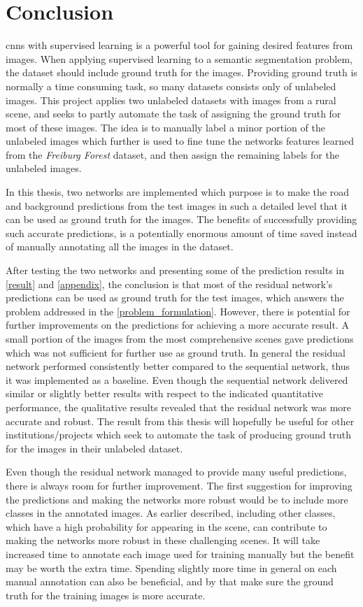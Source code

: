 \documentclass[USenglish]{ifimaster}  %
\begin{document}
\chapter{Conclusion}
\acp{cnn} with supervised learning is a powerful tool for gaining desired features from images. When applying supervised learning to a semantic segmentation problem, the dataset should include ground truth for the images. Providing ground truth is normally a time consuming task, so many datasets consists only of unlabeled images. This project applies two unlabeled datasets with images from a rural scene, and seeks to partly automate the task of assigning the ground truth for most of these images. The idea is to manually label a minor portion of the unlabeled images which further is used to fine tune the networks features learned from the \textit{Freiburg Forest} dataset, and then assign the remaining labels for the unlabeled images. 

In this thesis, two networks are implemented which purpose is to make the road and background predictions from the test images in such a detailed level that it can be used as ground truth for the images. The benefits of successfully providing such accurate predictions, is a potentially enormous amount of time saved instead of manually annotating all the images in the dataset. 

After testing the two networks and presenting some of the prediction results in \vref{result} and \vref{appendix}, the conclusion is that most of the residual network's predictions can be used as ground truth for the test images, which answers the problem addressed in the \vref{problem_formulation}. However, there is potential for further improvements on the predictions for achieving a more accurate result. A small portion of the images from the most comprehensive scenes gave predictions which was not sufficient for further use as ground truth. In general the residual network performed consistently better compared to the sequential network, thus it was implemented as a baseline. Even though the sequential network delivered similar or slightly better results with respect to the indicated quantitative performance, the qualitative results revealed that the residual network was more accurate and robust. The result from this thesis will hopefully be useful for other institutions/projects which seek to automate the task of producing ground truth for the images in their unlabeled dataset.

Even though the residual network managed to provide many useful predictions, there is always room for further improvement. The first suggestion for improving the predictions and making the networks more robust would be to include more classes in the annotated images. As earlier described, including other classes, which have a high probability for appearing in the scene, can contribute to making the networks more robust in these challenging scenes. It will take increased time to annotate each image used for training manually but the benefit may be worth the extra time. Spending slightly more time in general on each manual annotation can also be beneficial, and by that make sure the ground truth for the training images is more accurate.
\end{document}
